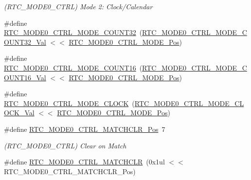 \begin{DoxyCompactItemize}
\begin{DoxyCompactList}\small\item\em (R\+T\+C\+\_\+\+M\+O\+D\+E0\+\_\+\+C\+T\+RL) Mode 2\+: Clock/\+Calendar \end{DoxyCompactList}\item 
\#define \mbox{\hyperlink{group___s_a_m_d21___r_t_c_gaaf34eaf40e0d54b3dd86ee05018b9683}{R\+T\+C\+\_\+\+M\+O\+D\+E0\+\_\+\+C\+T\+R\+L\+\_\+\+M\+O\+D\+E\+\_\+\+C\+O\+U\+N\+T32}}~(\mbox{\hyperlink{group___s_a_m_d21___r_t_c_ga8f1bfc130e4f32383f30fe113296fcf8}{R\+T\+C\+\_\+\+M\+O\+D\+E0\+\_\+\+C\+T\+R\+L\+\_\+\+M\+O\+D\+E\+\_\+\+C\+O\+U\+N\+T32\+\_\+\+Val}} $<$$<$ \mbox{\hyperlink{group___s_a_m_d21___r_t_c_gad69ab30ae21239fef57f25647924669f}{R\+T\+C\+\_\+\+M\+O\+D\+E0\+\_\+\+C\+T\+R\+L\+\_\+\+M\+O\+D\+E\+\_\+\+Pos}})
\item 
\#define \mbox{\hyperlink{group___s_a_m_d21___r_t_c_ga5dd6f705c5987bd6bbb7ff918e2491a1}{R\+T\+C\+\_\+\+M\+O\+D\+E0\+\_\+\+C\+T\+R\+L\+\_\+\+M\+O\+D\+E\+\_\+\+C\+O\+U\+N\+T16}}~(\mbox{\hyperlink{group___s_a_m_d21___r_t_c_ga928e5d7618bfd3df8f82a295c2b083ff}{R\+T\+C\+\_\+\+M\+O\+D\+E0\+\_\+\+C\+T\+R\+L\+\_\+\+M\+O\+D\+E\+\_\+\+C\+O\+U\+N\+T16\+\_\+\+Val}} $<$$<$ \mbox{\hyperlink{group___s_a_m_d21___r_t_c_gad69ab30ae21239fef57f25647924669f}{R\+T\+C\+\_\+\+M\+O\+D\+E0\+\_\+\+C\+T\+R\+L\+\_\+\+M\+O\+D\+E\+\_\+\+Pos}})
\item 
\#define \mbox{\hyperlink{group___s_a_m_d21___r_t_c_gabf3dee3efdad1b09e92d39c4bc0917d7}{R\+T\+C\+\_\+\+M\+O\+D\+E0\+\_\+\+C\+T\+R\+L\+\_\+\+M\+O\+D\+E\+\_\+\+C\+L\+O\+CK}}~(\mbox{\hyperlink{group___s_a_m_d21___r_t_c_ga3fd2a53e11d3770694da13f53de79a53}{R\+T\+C\+\_\+\+M\+O\+D\+E0\+\_\+\+C\+T\+R\+L\+\_\+\+M\+O\+D\+E\+\_\+\+C\+L\+O\+C\+K\+\_\+\+Val}} $<$$<$ \mbox{\hyperlink{group___s_a_m_d21___r_t_c_gad69ab30ae21239fef57f25647924669f}{R\+T\+C\+\_\+\+M\+O\+D\+E0\+\_\+\+C\+T\+R\+L\+\_\+\+M\+O\+D\+E\+\_\+\+Pos}})
\item 
\#define \mbox{\hyperlink{group___s_a_m_d21___r_t_c_ga2176e6cc2550dcd56de9613ec7240cae}{R\+T\+C\+\_\+\+M\+O\+D\+E0\+\_\+\+C\+T\+R\+L\+\_\+\+M\+A\+T\+C\+H\+C\+L\+R\+\_\+\+Pos}}~7
\begin{DoxyCompactList}\small\item\em (R\+T\+C\+\_\+\+M\+O\+D\+E0\+\_\+\+C\+T\+RL) Clear on Match \end{DoxyCompactList}\item 
\#define \mbox{\hyperlink{group___s_a_m_d21___r_t_c_gabe424b9b3eb0fcb5836a288f29338a5e}{R\+T\+C\+\_\+\+M\+O\+D\+E0\+\_\+\+C\+T\+R\+L\+\_\+\+M\+A\+T\+C\+H\+C\+LR}}~(0x1ul $<$$<$ R\+T\+C\+\_\+\+M\+O\+D\+E0\+\_\+\+C\+T\+R\+L\+\_\+\+M\+A\+T\+C\+H\+C\+L\+R\+\_\+\+Pos)

\end{DoxyCompactItemize}
